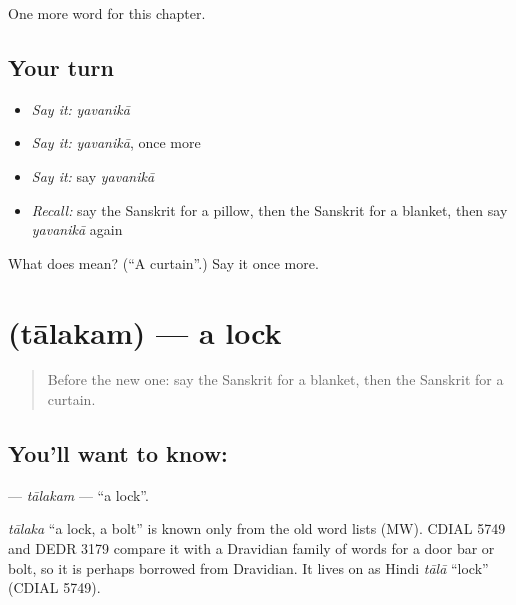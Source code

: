 \begin{grammarlens}[title={What you've built}]
One more word for this chapter.
\end{grammarlens}

\subsection*{Your turn}
\begin{itemize}
\raggedright
  \item \emph{Say it:} \emph{yavanikā}
  \item \emph{Say it:} \emph{yavanikā}, once more
  \item \emph{Say it:} say \emph{yavanikā}
  \item \emph{Recall:} say the Sanskrit for a pillow, then the Sanskrit for a blanket, then say \emph{yavanikā} again
\end{itemize}

\begin{tcolorbox}[breakable,colback=teal!4,colframe=teal!35!black,title={Before you move on}]
What does  mean? (\textquotedblleft{}A curtain\textquotedblright{}.) Say it once more.
\end{tcolorbox}
\section[\texorpdfstring{\sk{तालकम्} (tālakam)}{तालकम् (tālakam)}]{ (tālakam) — a lock}

\label{lesson:SA-C99-talakam}



\begin{quote}
Before the new one: say the Sanskrit for a blanket, then the Sanskrit for a curtain.
\end{quote}

\subsection*{You'll want to know: }
\textbf{} — \emph{tālakam} — \textquotedblleft{}a lock\textquotedblright{}.

\begin{cousinweb}
\emph{tālaka} \textquotedblleft{}a lock, a bolt\textquotedblright{} is known only from the old word lists (MW). CDIAL 5749 and DEDR 3179 compare it with a Dravidian family of words for a door bar or bolt, so it is perhaps borrowed from Dravidian. It lives on as Hindi \emph{tālā} \textquotedblleft{}lock\textquotedblright{} (CDIAL 5749).
\end{cousinweb}

